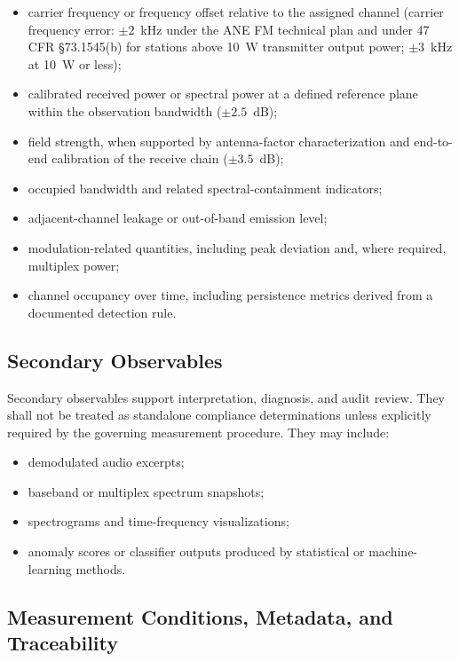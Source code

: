 \documentclass[11pt]{article}
\begin{document}
\begin{itemize}
    \item carrier frequency or frequency offset relative to the assigned channel (carrier frequency error: $\pm 2$~kHz under the ANE FM technical plan and under 47 CFR \S73.1545(b) for stations above 10~W transmitter output power; $\pm 3$~kHz at 10~W or less);
    \item calibrated received power or spectral power at a defined reference plane within the observation bandwidth ($\pm 2.5$~dB);
    \item field strength, when supported by antenna-factor characterization and end-to-end calibration of the receive chain ($\pm 3.5$~dB);
    \item occupied bandwidth and related spectral-containment indicators;
    \item adjacent-channel leakage or out-of-band emission level;
    \item modulation-related quantities, including peak deviation and, where required, multiplex power;
    \item channel occupancy over time, including persistence metrics derived from a documented detection rule.
\end{itemize}

\subsection*{Secondary Observables}

Secondary observables support interpretation, diagnosis, and audit review. They shall not be treated as standalone compliance determinations unless explicitly required by the governing measurement procedure. They may include:

\begin{itemize}
    \item demodulated audio excerpts;
    \item baseband or multiplex spectrum snapshots;
    \item spectrograms and time-frequency visualizations;
    \item anomaly scores or classifier outputs produced by statistical or machine-learning methods.
\end{itemize}

\subsection*{Measurement Conditions, Metadata, and Traceability}
\end{document}
